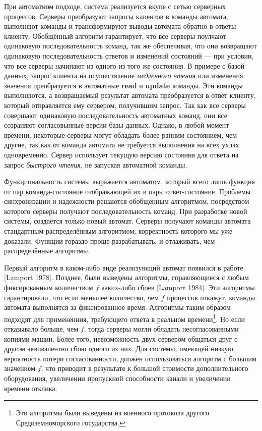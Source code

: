 \documentclass[12pt, a4paper]{article} %
\begin{document}
При автоматном подходе, система реализуется вкупе с сетью серверных процессов. Серверы преобразуют запросы клиентов в команды автомата, выполняют команды и трансформируют выводы автомата обратно в ответы клиенту. Обобщённый алгоритм гарантирует, что все серверы поулчают одинаковую последовательность команд, так же обеспечивая, что они возвращают одинаковую последовательность ответов и изменений состояний --- при условии, что все серверы начинают из одного из того же состояния. В примере с базой данных, запрос клиента на осуществление \textit{медленного чтения} или изменения значения преобразуется в автоматные \textbf{read} и \textbf{update} команды. Эти команды выполняются, а возвращаемый результат автомата преобразуется в ответ клиенту, который отправляется ему сервером, получившим запрос. Так как все серверы совершают одинаковую последовательность автоматных команд, они все созраняют согласовынные версии базы данных. Однако, в любой момент времени, некоторые серверы могут обладать более ранним состоянием, чем другие, так как от команда автомата не требуется выполнения на всех ухлах одновременно. Сервер использует текущую версию состояния для ответа на запрос \textit{быстрого чтения}, не запуская автоматной команды.

Функциональность системы выражается автоматом, который всего лишь функция от пар команда-состояние отображающей их в пары ответ-состояние. Проблемы синхронизации и надежности решаются обобщенным алгоритмом, посредством которого серверы получают последовательность команд. При разработке новой системы, создаётся только новый автомат. Серверы получают команды автомата стандартным распределённым алгоритмом, корректность которого мы уже доказали. Функции гораздо проще разрабатывать, и отлаживать, чем распределённые алгоритмы.

Первый алгоритм в каком-либо виде реализующий автомат появился в работе [Lamport 1978]. Позднее, были выведены алгоритмы, справляющиеся с любым фиксированным количеством $f$ каких-либо сбоев [Lamport 1984]. Эти алгоритмы гарантировали, что если меньшее количество, чем $f$ процессов откажут, команды автомата выполнятся за фиксированное время. Алгоритмы таким образом подходят для примененния, требующего ответа в реальном времени\footnote{Эти алгоритмы были выведены из военного протокола другого Средиземноморского государства.}. Но если отказывало больше, чем $f$, тогда серверы могли обладать несогласованными копиями машин. Более того, невозможность двух сервером общаться друг с другом эквивалентно сбою одного из них. Для системы, имеющей низкую вероятность потери согласованности, должен использоваться алгоритм с большим значением $f$, что приводит в результате к большой стоимости дополнительного оборудования, увеличении пропускной способности канали и увеличении времени отклика.
\end{document}
